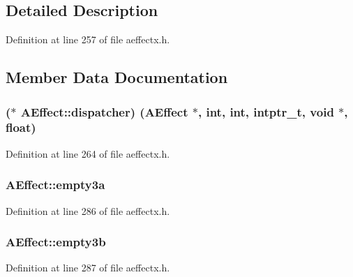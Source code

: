 \subsection{Detailed Description}


Definition at line 257 of file aeffectx.\+h.



\subsection{Member Data Documentation}
\subsubsection[{\texorpdfstring{dispatcher}{dispatcher}}]{($\ast$  A\+Effect\+::dispatcher) ({\bf A\+Effect} $\ast$, {\bf int}, {\bf int}, {\bf intptr\+\_\+t}, {\bf void} $\ast$, float)}\hypertarget{class_a_effect_a5873202548d2794e1a52a8b91ce2ccff}{}\label{class_a_effect_a5873202548d2794e1a52a8b91ce2ccff}


Definition at line 264 of file aeffectx.\+h.

\subsubsection[{\texorpdfstring{empty3a}{empty3a}}]{ A\+Effect\+::empty3a}\hypertarget{class_a_effect_a0ef99daaaf1472626919f4c53c05ade2}{}\label{class_a_effect_a0ef99daaaf1472626919f4c53c05ade2}


Definition at line 286 of file aeffectx.\+h.

\subsubsection[{\texorpdfstring{empty3b}{empty3b}}]{ A\+Effect\+::empty3b}\hypertarget{class_a_effect_a2ec83e43a8583472013bc62cf285beaa}{}\label{class_a_effect_a2ec83e43a8583472013bc62cf285beaa}


Definition at line 287 of file aeffectx.\+h.


